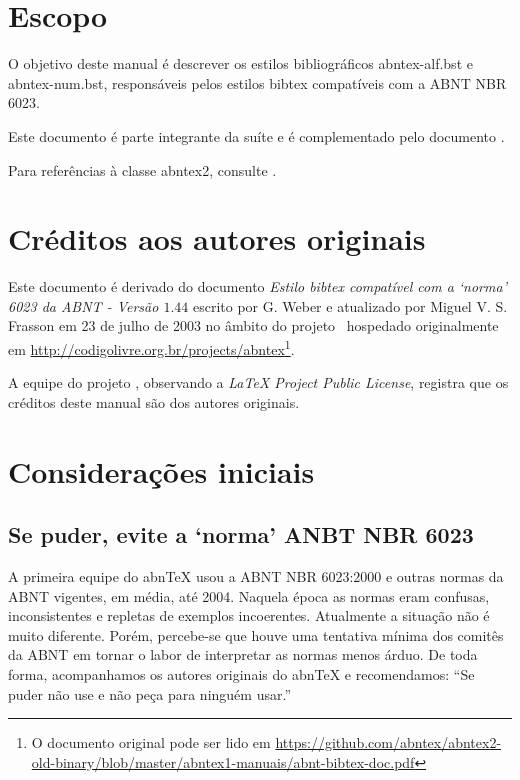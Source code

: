 \documentclass[a4paper]{ltxdoc}
\begin{document}
\tableofcontents
\listoftables

\section{Escopo}

O objetivo deste manual é descrever os estilos bibliográficos
\textsf{abntex-alf.bst} e \textsf{abntex-num.bst}, responsáveis pelos estilos
\textsf{bibtex} compatíveis com a ABNT NBR 6023. 

Este documento é parte integrante da suíte  e é complementado pelo
documento .

Para referências à classe \textsf{abntex2}, consulte .


\section{Créditos aos autores originais}

Este documento é derivado do documento \emph{Estilo bibtex compatível com a
`norma' 6023 da ABNT - Versão $ 1.44 $} escrito por G. Weber e atualizado por
Miguel V. S. Frasson em 23 de julho de 2003 no âmbito do projeto \abnTeX\
hospedado originalmente em
\url{http://codigolivre.org.br/projects/abntex}\footnote{O documento original pode ser lido em
\url{https://github.com/abntex/abntex2-old-binary/blob/master/abntex1-manuais/abnt-bibtex-doc.pdf}}.

A equipe do projeto , observando a \emph{LaTeX Project Public License},
registra que os créditos deste manual são dos autores originais.

\section{Considerações iniciais}

\subsection{Se puder, evite a `norma' ANBT NBR 6023}

A primeira equipe do abnTeX usou a ABNT NBR 6023:2000 e outras normas da ABNT
vigentes, em média, até 2004. Naquela época as normas eram confusas,
inconsistentes e repletas de exemplos incoerentes. Atualmente a situação não é
muito diferente. Porém, percebe-se que houve uma tentativa mínima dos comitês da
ABNT em tornar o labor de interpretar as normas menos árduo. De toda forma,
acompanhamos os autores originais do abnTeX e recomendamos: ``Se puder não use e
não peça para ninguém usar.''
\end{document}
